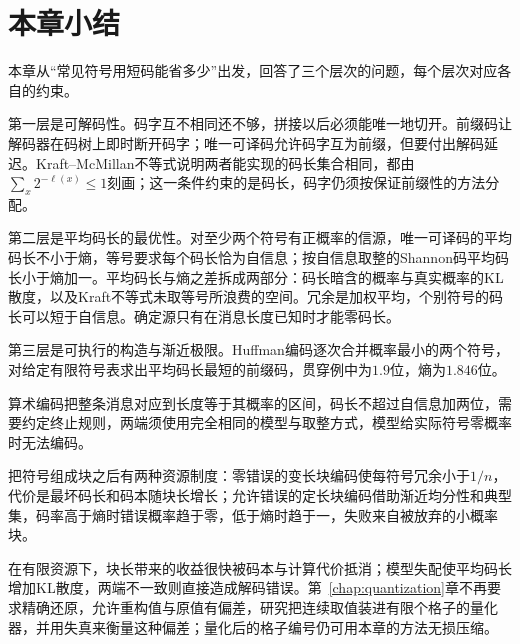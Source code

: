 \section{本章小结}
\label{sec:lossless-summary}

本章从“常见符号用短码能省多少”出发，回答了三个层次的问题，每个层次对应各自的约束。

第一层是可解码性。码字互不相同还不够，拼接以后必须能唯一地切开。前缀码让解码器在码树上即时断开码字；唯一可译码允许码字互为前缀，但要付出解码延迟。Kraft–McMillan不等式说明两者能实现的码长集合相同，都由$\sum_x2^{-\ell(x)}\leq1$刻画；这一条件约束的是码长，码字仍须按保证前缀性的方法分配。

第二层是平均码长的最优性。对至少两个符号有正概率的信源，唯一可译码的平均码长不小于熵，等号要求每个码长恰为自信息；按自信息取整的Shannon码平均码长小于熵加一。平均码长与熵之差拆成两部分：码长暗含的概率与真实概率的KL散度，以及Kraft不等式未取等号所浪费的空间。冗余是加权平均，个别符号的码长可以短于自信息。确定源只有在消息长度已知时才能零码长。

第三层是可执行的构造与渐近极限。Huffman编码逐次合并概率最小的两个符号，对给定有限符号表求出平均码长最短的前缀码，贯穿例中为$1.9$位，熵为$1.846$位。

算术编码把整条消息对应到长度等于其概率的区间，码长不超过自信息加两位，需要约定终止规则，两端须使用完全相同的模型与取整方式，模型给实际符号零概率时无法编码。

把符号组成块之后有两种资源制度：零错误的变长块编码使每符号冗余小于$1/n$，代价是最坏码长和码本随块长增长；允许错误的定长块编码借助渐近均分性和典型集，码率高于熵时错误概率趋于零，低于熵时趋于一，失败来自被放弃的小概率块。

在有限资源下，块长带来的收益很快被码本与计算代价抵消；模型失配使平均码长增加KL散度，两端不一致则直接造成解码错误。第~\ref{chap:quantization}章不再要求精确还原，允许重构值与原值有偏差，研究把连续取值装进有限个格子的量化器，并用失真来衡量这种偏差；量化后的格子编号仍可用本章的方法无损压缩。
